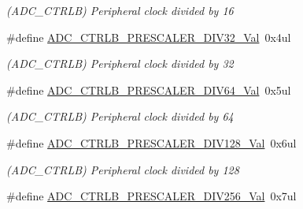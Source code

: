 \begin{DoxyCompactItemize}
\begin{DoxyCompactList}\small\item\em (A\+D\+C\+\_\+\+C\+T\+R\+L\+B) Peripheral clock divided by 16 \end{DoxyCompactList}\item 
\hypertarget{group___s_a_m_l21___a_d_c_gafd19aa73d07682c0d5d7fdda8ab230b5}{}\#define \hyperlink{group___s_a_m_l21___a_d_c_gafd19aa73d07682c0d5d7fdda8ab230b5}{A\+D\+C\+\_\+\+C\+T\+R\+L\+B\+\_\+\+P\+R\+E\+S\+C\+A\+L\+E\+R\+\_\+\+D\+I\+V32\+\_\+\+Val}~0x4ul\label{group___s_a_m_l21___a_d_c_gafd19aa73d07682c0d5d7fdda8ab230b5}

\begin{DoxyCompactList}\small\item\em (A\+D\+C\+\_\+\+C\+T\+R\+L\+B) Peripheral clock divided by 32 \end{DoxyCompactList}\item 
\hypertarget{group___s_a_m_l21___a_d_c_gafe5f527bda931e57829d72bfd2e9497f}{}\#define \hyperlink{group___s_a_m_l21___a_d_c_gafe5f527bda931e57829d72bfd2e9497f}{A\+D\+C\+\_\+\+C\+T\+R\+L\+B\+\_\+\+P\+R\+E\+S\+C\+A\+L\+E\+R\+\_\+\+D\+I\+V64\+\_\+\+Val}~0x5ul\label{group___s_a_m_l21___a_d_c_gafe5f527bda931e57829d72bfd2e9497f}

\begin{DoxyCompactList}\small\item\em (A\+D\+C\+\_\+\+C\+T\+R\+L\+B) Peripheral clock divided by 64 \end{DoxyCompactList}\item 
\hypertarget{group___s_a_m_l21___a_d_c_ga358d362ec0e79900891a5f240fdab4ec}{}\#define \hyperlink{group___s_a_m_l21___a_d_c_ga358d362ec0e79900891a5f240fdab4ec}{A\+D\+C\+\_\+\+C\+T\+R\+L\+B\+\_\+\+P\+R\+E\+S\+C\+A\+L\+E\+R\+\_\+\+D\+I\+V128\+\_\+\+Val}~0x6ul\label{group___s_a_m_l21___a_d_c_ga358d362ec0e79900891a5f240fdab4ec}

\begin{DoxyCompactList}\small\item\em (A\+D\+C\+\_\+\+C\+T\+R\+L\+B) Peripheral clock divided by 128 \end{DoxyCompactList}\item 
\hypertarget{group___s_a_m_l21___a_d_c_gaf654c74504398792bf66d522f00673fa}{}\#define \hyperlink{group___s_a_m_l21___a_d_c_gaf654c74504398792bf66d522f00673fa}{A\+D\+C\+\_\+\+C\+T\+R\+L\+B\+\_\+\+P\+R\+E\+S\+C\+A\+L\+E\+R\+\_\+\+D\+I\+V256\+\_\+\+Val}~0x7ul\label{group___s_a_m_l21___a_d_c_gaf654c74504398792bf66d522f00673fa}


\end{DoxyCompactItemize}

